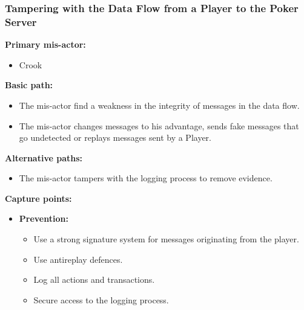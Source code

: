\documentclass[a4paper,11pt]{report}
\begin{document}
\subsubsection{Tampering with the Data Flow from a Player to the Poker Server}
\textbf{Primary mis-actor:}
\begin{itemize}
\item Crook
\end{itemize}
\textbf{Basic path:}
\begin{itemize}
\item The mis-actor find a weakness in the integrity of messages in the data flow.
\item The mis-actor changes messages to his advantage, sends fake messages that go undetected or replays messages sent by a Player.
\end{itemize}
\textbf{Alternative paths:}
\begin{itemize}
\item The mis-actor tampers with the logging process to remove evidence.
\end{itemize}
\textbf{Capture points:}
\begin{itemize}
\item \textbf{Prevention:}
\begin{itemize}
\item Use a strong signature system for messages originating from the player.
\item Use antireplay defences.
\item Log all actions and transactions.
\item Secure access to the logging process.
\end{itemize}
\end{itemize}
\end{document}
